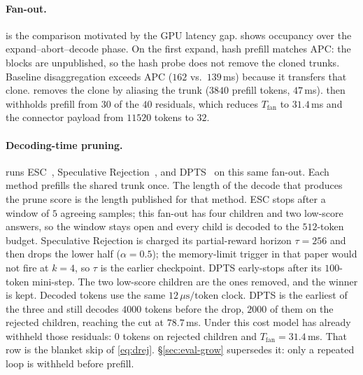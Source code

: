 \paragraph{Fan-out.}
 is the comparison motivated by the GPU latency gap.
 shows occupancy over the expand--abort--decode phase.
On the first expand, hash prefill matches APC: the blocks are unpublished, so the hash probe does not remove the cloned trunks.
Baseline disaggregation exceeds APC ($162$ vs.\ $139$\,ms) because it transfers that clone.
\sys removes the clone by aliasing the trunk ($3840$ prefill tokens, $47$\,ms).
\app then withholds prefill from $30$ of the $40$ residuals, which reduces $T_{\mathrm{fan}}$ to $31.4$\,ms and the connector payload from $11520$ tokens to $32$.

\paragraph{Decoding-time pruning.}
 runs ESC~\cite{esc}, Speculative Rejection~\cite{specrej}, and DPTS~\cite{dpts} on this same fan-out.
Each method prefills the shared trunk once.
The length of the decode that produces the prune score is the length published for that method.
ESC stops after a window of $5$ agreeing samples; this fan-out has four children and two low-score answers, so the window stays open and every child is decoded to the $512$-token budget.
Speculative Rejection is charged its partial-reward horizon $\tau{=}256$ and then drops the lower half ($\alpha{=}0.5$); the memory-limit trigger in that paper would not fire at $k{=}4$, so $\tau$ is the earlier checkpoint.
DPTS early-stops after its $100$-token mini-step.
The two low-score children are the ones removed, and the winner is kept.
Decoded tokens use the same $12\,\mu\mathrm{s}/\mathrm{token}$ clock.
DPTS is the earliest of the three and still decodes $4000$ tokens before the drop, $2000$ of them on the rejected children, reaching the cut at $78.7$\,ms.
Under this cost model \app has already withheld those residuals: $0$ tokens on rejected children and $T_{\mathrm{fan}}{=}31.4$\,ms.
That row is the blanket skip of \eqref{eq:drej}.
\S\ref{sec:eval-grow} supersedes it: only a repeated loop is withheld before prefill.


